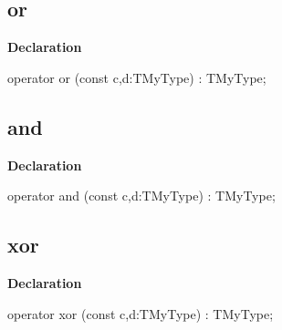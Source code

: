 \documentclass{report}
\begin{document}
\subsection*{or}
\begin{list}{}{
\setlength{\itemindent}{0cm}
\setlength{\listparindent}{0cm}
\setlength{\leftmargin}{\evensidemargin}
\addtolength{\leftmargin}{\tmplength}
\settowidth{\labelsep}{X}
\addtolength{\leftmargin}{\labelsep}
\setlength{\labelwidth}{\tmplength}
}
\begin{flushleft}
\item[\textbf{Declaration}\hfill]
\begin{ttfamily}
operator or (const c,d:TMyType) : TMyType;\end{ttfamily}


\end{flushleft}
\end{list}
\subsection*{and}
\begin{list}{}{
\setlength{\itemindent}{0cm}
\setlength{\listparindent}{0cm}
\setlength{\leftmargin}{\evensidemargin}
\addtolength{\leftmargin}{\tmplength}
\settowidth{\labelsep}{X}
\addtolength{\leftmargin}{\labelsep}
\setlength{\labelwidth}{\tmplength}
}
\begin{flushleft}
\item[\textbf{Declaration}\hfill]
\begin{ttfamily}
operator and (const c,d:TMyType) : TMyType;\end{ttfamily}


\end{flushleft}
\end{list}
\subsection*{xor}
\begin{list}{}{
\setlength{\itemindent}{0cm}
\setlength{\listparindent}{0cm}
\setlength{\leftmargin}{\evensidemargin}
\addtolength{\leftmargin}{\tmplength}
\settowidth{\labelsep}{X}
\addtolength{\leftmargin}{\labelsep}
\setlength{\labelwidth}{\tmplength}
}
\begin{flushleft}
\item[\textbf{Declaration}\hfill]
\begin{ttfamily}
operator xor (const c,d:TMyType) : TMyType;\end{ttfamily}


\end{flushleft}
\end{list}
\end{document}
